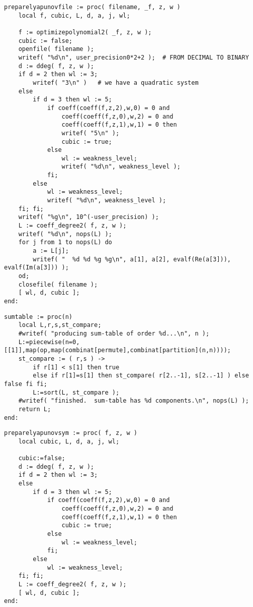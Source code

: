 \documentclass[a4paper,10pt]{article}
\begin{document}
\begin{lstlisting}[name=weakfocus]
preparelyapunovfile := proc( filename, _f, z, w )
    local f, cubic, L, d, a, j, wl;

    f := optimizepolynomial2( _f, z, w );
    cubic := false;
    openfile( filename );
    writef( "%d\n", user_precision0*2+2 );  # FROM DECIMAL TO BINARY
    d := ddeg( f, z, w );
    if d = 2 then wl := 3;
        writef( "3\n" )   # we have a quadratic system
    else
        if d = 3 then wl := 5;
            if coeff(coeff(f,z,2),w,0) = 0 and
                coeff(coeff(f,z,0),w,2) = 0 and
                coeff(coeff(f,z,1),w,1) = 0 then
                writef( "5\n" );
                cubic := true;
            else
                wl := weakness_level;
                writef( "%d\n", weakness_level );
            fi;
        else
            wl := weakness_level;
            writef( "%d\n", weakness_level );
    fi; fi;
    writef( "%g\n", 10^(-user_precision) );
    L := coeff_degree2( f, z, w );
    writef( "%d\n", nops(L) );
    for j from 1 to nops(L) do
        a := L[j];
        writef( "  %d %d %g %g\n", a[1], a[2], evalf(Re(a[3])), evalf(Im(a[3])) );
    od;
    closefile( filename );
    [ wl, d, cubic ];
end:
\end{lstlisting}

\begin{lstlisting}[name=weakfocus]
sumtable := proc(n)
    local L,r,s,st_compare;
    #writef( "producing sum-table of order %d...\n", n );
    L:=piecewise(n=0,[[1]],map(op,map(combinat[permute],combinat[partition](n,n))));
    st_compare := ( r,s ) ->
        if r[1] < s[1] then true
        else if r[1]=s[1] then st_compare( r[2..-1], s[2..-1] ) else false fi fi;
        L:=sort(L, st_compare );
    #writef( "finished.  sum-table has %d components.\n", nops(L) );
    return L;
end:
\end{lstlisting}

\begin{lstlisting}
preparelyapunovsym := proc( f, z, w )
    local cubic, L, d, a, j, wl;

    cubic:=false;
    d := ddeg( f, z, w );
    if d = 2 then wl := 3;
    else
        if d = 3 then wl := 5;
            if coeff(coeff(f,z,2),w,0) = 0 and
                coeff(coeff(f,z,0),w,2) = 0 and
                coeff(coeff(f,z,1),w,1) = 0 then
                cubic := true;
            else
                wl := weakness_level;
            fi;
        else
            wl := weakness_level;
    fi; fi;
    L := coeff_degree2( f, z, w );
    [ wl, d, cubic ];
end:
\end{lstlisting}
\end{document}
